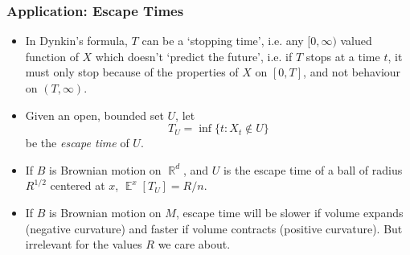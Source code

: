 \documentclass[usenames,dvipsnames,12pt]{beamer}
\DeclareMathOperator{\RR}{\mathbb{R}}
\DeclareMathOperator{\EE}{\mathbb{E}}
\begin{document}
\begin{frame}
    \frametitle{Application: Escape Times}

    \begin{itemize}
        \item In Dynkin's formula, $T$ can be a `stopping time', i.e. any $[0,\infty)$ valued function of $X$ which doesn't `predict the future', i.e. if $T$ stops at a time $t$, it must only stop because of the properties of $X$ on $[0,T]$, and not behaviour on $(T,\infty)$.

        \item Given an open, bounded set $U$, let
        \[ T_U = \inf \{ t : X_t \not \in U \} \]
        be the \emph{escape time} of $U$.

        \item If $B$ is Brownian motion on $\RR^d$, and $U$ is the escape time of a ball of radius $R^{1/2}$ centered at $x$, $\EE^x[T_U] = R / n$.

        \item If $B$ is Brownian motion on $M$, escape time will be slower if volume expands (negative curvature) and faster if volume contracts (positive curvature). But irrelevant for the values $R$ we care about.
    \end{itemize}
\end{frame}
\end{document}
